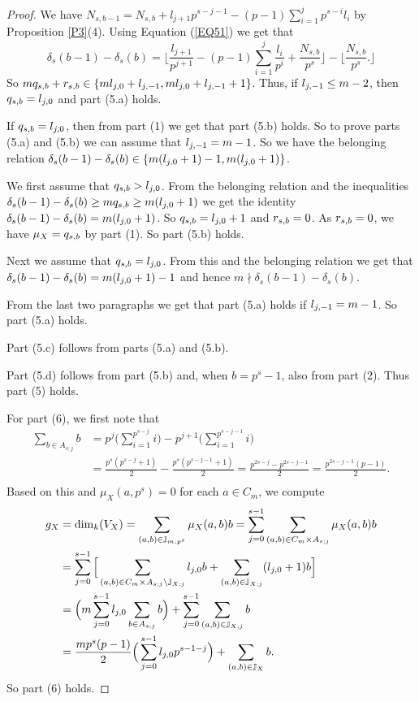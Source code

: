 \documentclass[10pt,a4paper]{amsart}
\def\l{\textup{l}}
\def\q{\textup{q}}
\def\r{\textup{r}}
\begin{document}
\begin{proof}
We have $N_{s,b-1}=N_{s,b}+l_{j+1}p^{s-j-1}-(p-1)\sum_{i=1}^j p^{s-i}l_i$ by Proposition \ref{P3}(4). Using Equation (\ref{EQ51}) we get that
$$\delta_s(b-1)-\delta_s(b)=\Big\lfloor \frac{l_{j+1}}{p^{j+1}}-(p-1)\sum_{i=1}^j\frac{l_i}{p^i}+\frac{N_{s,b}}{p^s}\Big\rfloor-\Big\lfloor\frac{N_{s,b}}{p^s}.\Big\rfloor$$ 
So $m\q_{s,b}+\r_{s,b}\in\{m\l_{j,0}+\l_{j,-1},m\l_{j,0}+\l_{j,-1}+1\}$. Thus, if $\l_{j,-1}\le m-2$, then $\q_{s,b}=\l_{j,0}$ and part (5.a) holds. 

If $\q_{s,b}=\l_{j,0}$, then from part (1) we get that part (5.b) holds. So to prove parts (5.a) and (5.b) we can assume that $\l_{j,-1}=m-1$. So we have the belonging relation $\delta_s(b-1)-\delta_s(b)\in\{m(\l_{j,0}+1)-1,m(\l_{j,0}+1)\}$.

We first assume that $\q_{s,b}>\l_{j,0}$. From the belonging relation and the inequalities $\delta_s(b-1)-\delta_s(b)\ge m\q_{s,b}\ge m(\l_{j,0}+1)$ we get the identity $\delta_s(b-1)-\delta_s(b)=m(\l_{j,0}+1)$. So $\q_{s,b}=\l_{j,0}+1$ and $\r_{s,b}=0$. As $\r_{s,b}=0$, we have $\mu_X=\q_{s,b}$ by part (1). So part (5.b) holds. 

Next we assume that $\q_{s,b}=\l_{j,0}$. From this and the belonging relation we get that $\delta_s(b-1)-\delta_s(b)=m(\l_{j,0}+1)-1$ and hence $m\nmid \delta_s(b-1)-\delta_s(b)$. 

From the last two paragraphs we get that part (5.a) holds if $\l_{j,-1}=m-1$. So part (5.a) holds. 

Part (5.c) follows from parts (5.a) and (5.b). 

Part (5.d) follows from part (5.b) and, when $b=p^s-1$, also from part (2). Thus part (5) holds.

For part (6), we first note that 
\begin{equation*}
\begin{aligned}
\sum_{b\in A_{s;j}} b&=p^j\Big(\sum_{i=1}^{p^{s-j}} i\Big)-p^{j+1}\Big(\sum_{i=1}^{p^{s-j-1}} i\Big)\\
&=\frac{p^{s}(p^{s-j}+1)}{2}-\frac{p^{s}(p^{s-j-1}+1)}{2}=\frac{p^{2s-j}-p^{2s-j-1}}{2}=\frac{p^{2s-j-1}(p-1)}{2}.\\
\end{aligned}
\end{equation*}
Based on this and $\mu_X(a,p^s)=0$ for each $a\in C_m$, we compute
\begin{equation*}
\begin{aligned}
\textup{g}_X&=\dim_k(V_X)=\sum_{(a,b)\in\mathbb J_{m,p^s}}\mu_X(a,b)b=\sum_{j=0}^{s-1} \sum_{(a,b)\in C_m\times A_{s;j}}\mu_X(a,b)b\\
&=\sum_{j=0}^{s-1} \Big[\sum_{(a,b)\in C_m\times A_{s;j}\setminus\mathbb J_{X;j}} \l_{j,0}b+\sum_{(a,b)\in \mathbb J_{X;j}} (\l_{j,0}+1)b\Big]\\
&=\Big(m\sum_{j=0}^{s-1} \l_{j,0}\sum_{b\in A_{s;j}} b\Big)+\sum_{j=0}^{s-1}\sum_{(a,b)\in \mathbb J_{X;j}}b\\
&=\frac{mp^s(p-1)}{2}\Big(\sum_{j=0}^{s-1} \l_{j,0}p^{s-1-j}\Big)+\sum_{(a,b)\in\mathbb J_X} b.\\
\end{aligned}
\end{equation*}
So part (6) holds.\end{proof}
\end{document}
